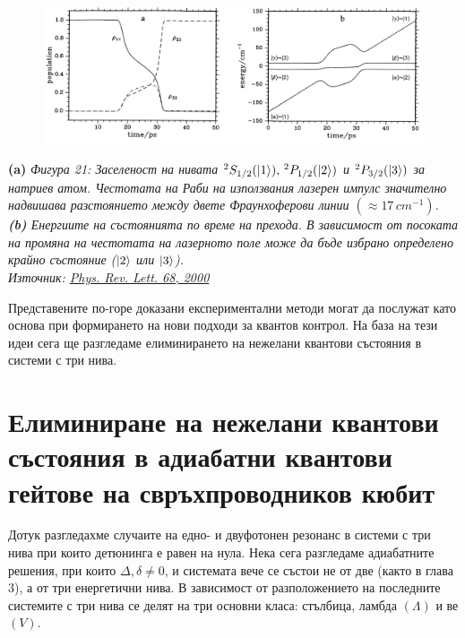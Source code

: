     \begin{figure}[H]
        \centering
        \includegraphics[width=450pt]{25.png}
    \end{figure}
    \begin{center}
        \small \textbf{(a)} \textit{Фигура 21: Заселеност на нивата $^2S_{1/2} (\ket{1}) , \, ^2P_{1/2} (\ket{2})$ и $^2P_{3/2} (\ket{3})$ за натриев атом. Честотата на Раби на използвания лазерен импулс значително надвишава
        разстоянието между двете Фраунхоферови линии $(\approx 17 \, cm^{-1})$. \textbf{(b)} Енергиите на състоянията по време на прехода. В зависимост от посоката на промяна на честотата на лазерното поле може да
        бъде избрано определено крайно състояние ($\ket{2}$ или $\ket{3}$).\\
        Източник: \href{https://journals.aps.org/prl/abstract/10.1103/PhysRevLett.68.2000}{Phys. Rev. Lett. 68, 2000}} \cite{melinger1992generation}\\
    \end{center}

    Представените по-горе доказани експериментални методи могат да послужат като основа при формирането на нови подходи за квантов контрол. На база на тези идеи сега ще разгледаме елиминирането на нежелани квантови състояния в системи с три нива.

    \section{Елиминиране на нежелани квантови състояния в адиабатни квантови гейтове на свръхпроводников кюбит}
    
    Дотук разгледахме случаите на едно- и двуфотонен резонанс в системи с три нива при които детюнинга е равен на нула. Нека сега разгледаме адиабатните решения, при които
    $\Delta,\delta\ne 0$, и системата вече се състои не от две (както в глава 3), а от три енергетични нива. В зависимост от разположението на последните системите с три нива
    се делят на три основни класа: стълбица, ламбда $(\Lambda)$ и ве $(V)$.


